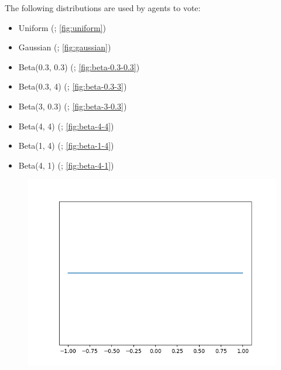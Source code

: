 The following distributions are used by agents to vote:
\begin{itemize}
    \item Uniform (; \autoref{fig:uniform})
    \item Gaussian (; \autoref{fig:gaussian})
    \item Beta(0.3, 0.3) (; \autoref{fig:beta-0.3-0.3})
    \item Beta(0.3, 4) (; \autoref{fig:beta-0.3-3})
    \item Beta(3, 0.3) (; \autoref{fig:beta-3-0.3})
    \item Beta(4, 4) (; \autoref{fig:beta-4-4})
    \item Beta(1, 4) (; \autoref{fig:beta-1-4})
    \item Beta(4, 1) (; \autoref{fig:beta-4-1})
\end{itemize}

\begin{figure}[!h]
    \centering
    \includegraphics[scale=0.5]
    {./content/figures/dists/uniform}
    \caption{}
    \label{fig:uniform}
\end{figure}


